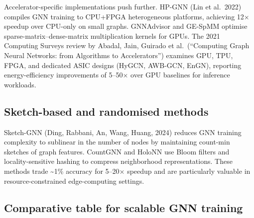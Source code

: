 \documentclass{article}
\begin{document}
Accelerator-specific implementations push further. HP-GNN (Lin et al.~2022) compiles GNN training to CPU+FPGA heterogeneous platforms, achieving 12× speedup over CPU-only on small graphs. GNNAdvisor and GE-SpMM optimise sparse-matrix--dense-matrix multiplication kernels for GPUs. The 2021 Computing Surveys review by Abadal, Jain, Guirado et al.~(``Computing Graph Neural Networks: from Algorithms to Accelerators'') examines GPU, TPU, FPGA, and dedicated ASIC designs (HyGCN, AWB-GCN, EnGN), reporting energy-efficiency improvements of 5--50× over GPU baselines for inference workloads.

\subsection{Sketch-based and randomised methods}\label{sketch-based-and-randomised-methods}

Sketch-GNN (Ding, Rabbani, An, Wang, Huang, 2024) reduces GNN training complexity to sublinear in the number of nodes by maintaining count-min sketches of graph features. CountGNN and HoloNN use Bloom filters and locality-sensitive hashing to compress neighborhood representations. These methods trade \textasciitilde1\% accuracy for 5--20× speedup and are particularly valuable in resource-constrained edge-computing settings.

\subsection{Comparative table for scalable GNN training}\label{comparative-table-for-scalable-gnn-training}
\end{document}
